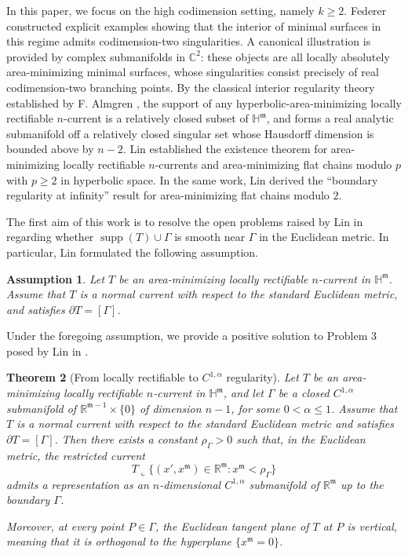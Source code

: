 \documentclass[11pt,reqno]{amsart}
\newcommand{\fm}{\mathfrak{m}}
\renewcommand{\leq}{\leqslant}
\renewcommand{\geq}{\geqslant}
\newtheorem{theorem}{Theorem}[section]
\newtheorem{assumption}[theorem]{Assumption}
\theoremstyle{definition}
\numberwithin{equation}{section}
\begin{document}
\medskip
In this paper, we focus on the high codimension setting, namely \(k\geq 2\). Federer \cite{Federer} constructed explicit examples showing that the interior of minimal surfaces in this regime admits codimension-two singularities. A canonical illustration is provided by complex submanifolds in \(\mathbb{C}^{2}\): these objects are all locally absolutely area-minimizing minimal surfaces, whose singularities consist precisely of real codimension-two branching points.
 By the classical interior regularity theory established by F. Almgren \cite{Almgren}, the support of any hyperbolic-area-minimizing locally rectifiable $n$-current is a relatively closed subset of $\mathbb{H}^\fm$, and forms a real analytic submanifold off a relatively closed singular set whose Hausdorff dimension is bounded above by $n-2$.
Lin \cite{Lin1989CPAM} established the existence theorem for area-minimizing locally rectifiable $n$-currents and area-minimizing flat chains modulo $p$ with $p\geq 2$ in hyperbolic space. In the same work, Lin derived the ``boundary regularity at infinity'' result for area-minimizing flat chains modulo $2$.



The first aim of this work is to resolve the open problems raised by Lin in \cite{Lin1989CPAM} regarding whether $\operatorname{supp}(T)\cup\Gamma$ is smooth near $\Gamma$ in the Euclidean metric. In particular, Lin \cite{Lin1989CPAM} formulated the following assumption.

\begin{assumption}\label{assmp-normal}
Let $T$ be an area-minimizing locally rectifiable $n$-current in $\mathbb{H}^\fm$. Assume that $T$ is a normal current with respect to the standard Euclidean metric, and satisfies $\partial T = [\Gamma]$.
\end{assumption}

Under the foregoing assumption, we provide a positive solution to Problem 3 posed by Lin in \cite{Lin1989CPAM}.

\begin{theorem}[From locally rectifiable to \(C^{1,\alpha}\) regularity] \label{thm:rectifiable-C-1-alpha}
Let $T$ be an area-minimizing locally rectifiable $n$-current in $\mathbb{H}^\fm$, and let $\Gamma$ be a closed $C^{1,\alpha}$ submanifold of $\mathbb{R}^{\fm-1} \times \{0\}$ of dimension $n-1$, for some $0<\alpha\leq 1$. Assume that $T$ is a normal current with respect to the standard Euclidean metric and satisfies $\partial T = [\Gamma]$. Then there exists a constant $\rho_\Gamma>0$ such that, in the Euclidean metric, the restricted current
\[
T \mathbin{\llcorner} \bigl\{ (x', x^\fm )\in \mathbb{R}^\fm : x^\fm <\rho_\Gamma \bigr\}
\]
admits a representation as an $n$-dimensional $C^{1,\alpha}$ submanifold of $\mathbb{R}^\fm$ up to the boundary $\Gamma$.

Moreover, at every point $P\in \Gamma$, the Euclidean tangent plane of $T$ at $P$ is vertical, meaning that it is orthogonal to the hyperplane $\{x^\fm=0\}$.
\end{theorem}
\end{document}
